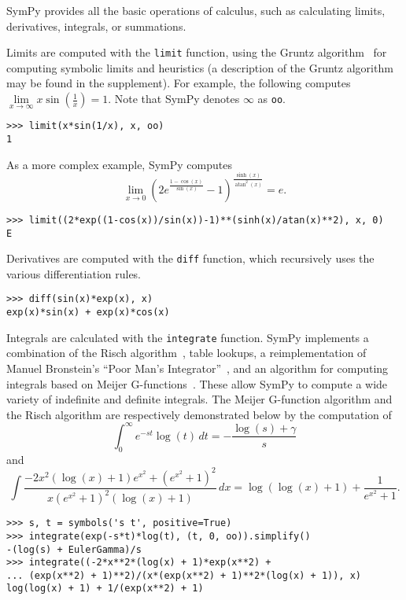 SymPy provides all the basic operations of calculus, such as calculating
limits, derivatives, integrals, or summations.

Limits are computed with the \verb|limit| function, using the Gruntz
algorithm~\cite{Gruntz1996limits} for computing symbolic limits and heuristics (a description of the Gruntz algorithm may be found in the supplement).
For example, the following computes
$\lim\limits_{x\to \infty} x\sin(\frac{1}{x})=1$. Note that SymPy denotes
$\infty$ as \verb|oo|.
\begin{verbatim}
>>> limit(x*sin(1/x), x, oo)
1
\end{verbatim}
As a more complex example, SymPy computes \[\lim\limits_{x\to 0}{\left(2 e^{\frac{1 - \cos{\left (x \right )}}{\sin{\left (x \right )}}} -
  1\right)}^{\frac{\sinh{\left (x \right )}}{\operatorname{atan}^{2}{\left (x
      \right )}}} = e.\]
\begin{verbatim}
>>> limit((2*exp((1-cos(x))/sin(x))-1)**(sinh(x)/atan(x)**2), x, 0)
E
\end{verbatim}

Derivatives are computed with the \verb|diff| function, which recursively uses
the various differentiation rules.
\begin{verbatim}
>>> diff(sin(x)*exp(x), x)
exp(x)*sin(x) + exp(x)*cos(x)
\end{verbatim}

Integrals are calculated with the \verb|integrate| function. SymPy
implements a combination of the Risch
algorithm~\cite{bronstein2005integration}, table lookups, a reimplementation
of Manuel Bronstein's ``Poor Man's Integrator''~\cite{Bronstein2005pmint}, and
an algorithm for computing integrals based on Meijer G-functions~\cite{Roach1996hyper,roach1997meijerg}. These allow
SymPy to compute a wide variety of indefinite and definite integrals. The
Meijer G-function algorithm and the Risch algorithm are respectively
demonstrated below by the computation of \[\int_{0}^{\infty} e^{-s t}\log{\left (t \right )}\, dt = - \frac{ \log{\left (s \right )} + \gamma}{s}\] and \[\int \frac{- 2 x^{2} \left(\log{\left (x \right )} + 1\right) e^{x^{2}} + {\left(e^{x^{2}} + 1\right)}^{2}}{x {\left(e^{x^{2}} + 1\right)}^{2} \left(\log{\left (x \right )} + 1\right)}\, dx = \log{\left (\log{\left (x \right )} + 1 \right )} + \frac{1}{e^{x^{2}} + 1}.\]
\begin{verbatim}
>>> s, t = symbols('s t', positive=True)
>>> integrate(exp(-s*t)*log(t), (t, 0, oo)).simplify()
-(log(s) + EulerGamma)/s
>>> integrate((-2*x**2*(log(x) + 1)*exp(x**2) +
... (exp(x**2) + 1)**2)/(x*(exp(x**2) + 1)**2*(log(x) + 1)), x)
log(log(x) + 1) + 1/(exp(x**2) + 1)
\end{verbatim}

